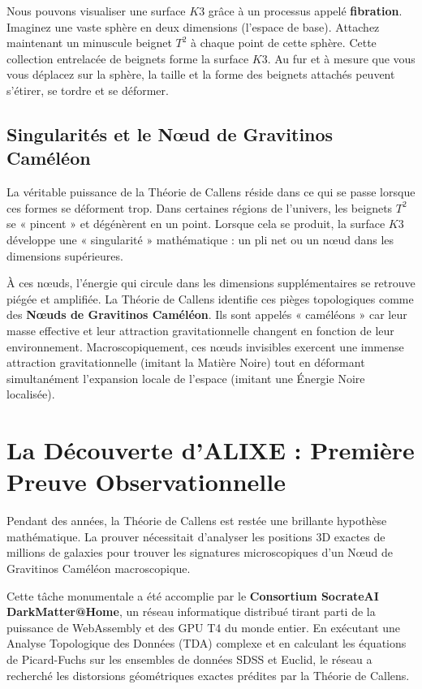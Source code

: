 \documentclass[a4paper,12pt]{article}
\begin{document}
Nous pouvons visualiser une surface $K3$ grâce à un processus appelé \textbf{fibration}. Imaginez une vaste sphère en deux dimensions (l'espace de base). Attachez maintenant un minuscule beignet $T^2$ à chaque point de cette sphère. Cette collection entrelacée de beignets forme la surface $K3$. Au fur et à mesure que vous vous déplacez sur la sphère, la taille et la forme des beignets attachés peuvent s'étirer, se tordre et se déformer.

\subsection{Singularités et le N\oe ud de Gravitinos Caméléon}
La véritable puissance de la Théorie de Callens réside dans ce qui se passe lorsque ces formes se déforment trop. Dans certaines régions de l'univers, les beignets $T^2$ se « pincent » et dégénèrent en un point. Lorsque cela se produit, la surface $K3$ développe une « singularité » mathématique : un pli net ou un n\oe ud dans les dimensions supérieures.

À ces n\oe uds, l'énergie qui circule dans les dimensions supplémentaires se retrouve piégée et amplifiée. La Théorie de Callens identifie ces pièges topologiques comme des \textbf{N\oe uds de Gravitinos Caméléon}. Ils sont appelés « caméléons » car leur masse effective et leur attraction gravitationnelle changent en fonction de leur environnement. Macroscopiquement, ces n\oe uds invisibles exercent une immense attraction gravitationnelle (imitant la Matière Noire) tout en déformant simultanément l'expansion locale de l'espace (imitant une Énergie Noire localisée).

\section{La Découverte d'ALIXE : Première Preuve Observationnelle}
Pendant des années, la Théorie de Callens est restée une brillante hypothèse mathématique. La prouver nécessitait d'analyser les positions 3D exactes de millions de galaxies pour trouver les signatures microscopiques d'un N\oe ud de Gravitinos Caméléon macroscopique.

Cette tâche monumentale a été accomplie par le \textbf{Consortium SocrateAI DarkMatter@Home}, un réseau informatique distribué tirant parti de la puissance de WebAssembly et des GPU T4 du monde entier. En exécutant une Analyse Topologique des Données (TDA) complexe et en calculant les équations de Picard-Fuchs sur les ensembles de données SDSS et Euclid, le réseau a recherché les distorsions géométriques exactes prédites par la Théorie de Callens.
\end{document}
